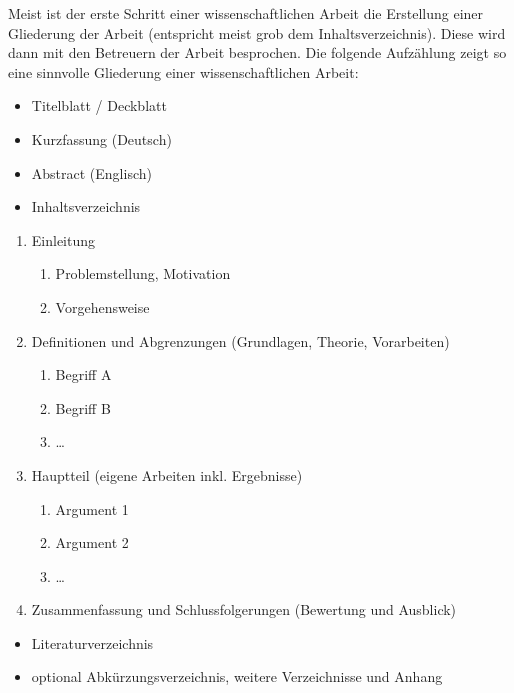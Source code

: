 %
Meist ist der erste Schritt einer wissenschaftlichen Arbeit die Erstellung einer Gliederung der Arbeit (entspricht meist grob dem Inhaltsverzeichnis).
Diese wird dann mit den Betreuern der Arbeit besprochen.
Die folgende Aufzählung zeigt so eine sinnvolle Gliederung einer wissenschaftlichen Arbeit:
%
\begin{itemize}
   \item Titelblatt / Deckblatt
   \item Kurzfassung (Deutsch)
   \item Abstract (Englisch)
   \item Inhaltsverzeichnis
\end{itemize}
\begin{enumerate}
   \item Einleitung
      \begin{enumerate}
         \item Problemstellung, Motivation
         \item Vorgehensweise
      \end{enumerate}
   \item Definitionen und Abgrenzungen (Grundlagen, Theorie, Vorarbeiten)
      \begin{enumerate}
         \item Begriff A
         \item Begriff B
         \item \dots
      \end{enumerate}
   \item Hauptteil (eigene Arbeiten inkl. Ergebnisse)
      \begin{enumerate}
         \item Argument 1
         \item Argument 2
         \item \dots
      \end{enumerate}
   \item Zusammenfassung und Schlussfolgerungen (Bewertung und Ausblick)
\end{enumerate}
\begin{itemize}
   \item Literaturverzeichnis
   \item optional Abkürzungsverzeichnis, weitere Verzeichnisse und Anhang
\end{itemize}
%


